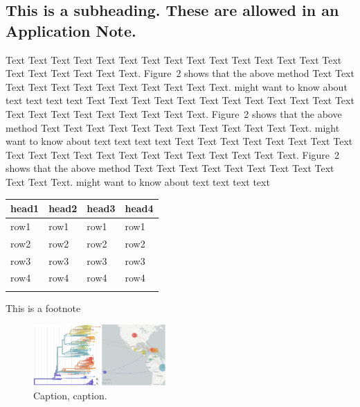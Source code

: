 \documentclass{bioinfo}
\begin{document}
\subsection*{This is a subheading. These are allowed in an Application Note.}

Text Text Text Text Text Text  Text Text Text Text Text Text Text
Text Text  Text Text Text Text Text Text.
Figure~2\vphantom{\ref{nextstrain}} shows that the above method  Text
Text Text Text  Text Text Text Text Text Text  Text Text.
\citealp{neher2015nextflu} might want to know about  text text text text
Text Text Text Text Text Text  Text Text Text Text Text Text Text
Text Text  Text Text Text Text Text Text.
Figure~2\vphantom{\ref{nextstrain}} shows that the above method  Text
Text Text Text  Text Text Text Text Text Text  Text Text.
\citealp{neher2015nextflu} might want to know about  text text text text
Text Text Text Text Text Text Text Text Text Text Text Text Text
Text Text  Text Text Text Text Text Text.
Figure~2\vphantom{\ref{nextstrain}} shows that the above method  Text
Text Text Text  Text Text Text Text Text Text  Text Text.
\citealp{neher2015nextflu} might want to know about  text text\break
text text

\begin{table}[!t]
 {\begin{tabular}{@{}llll@{}}\toprule head1 &
head2 & head3 & head4\\\midrule
row1 & row1 & row1 & row1\\
row2 & row2 & row2 & row2\\
row3 & row3 & row3 & row3\\
row4 & row4 & row4 & row4\\\botrule
\end{tabular}}{This is a footnote}
\end{table}

\begin{figure}[!tpb]
\centerline{\includegraphics[width=0.45\textwidth]{figures/nextstrain}}
\caption{Caption, caption.}\label{nextstrain}
\end{figure}
\end{document}
